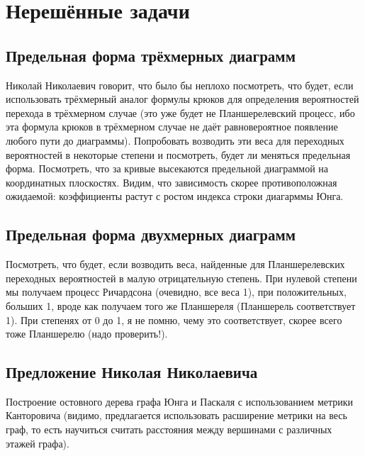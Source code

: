 \documentclass[12pt]{report}
\begin{document}
\section* {Нерешённые задачи}

\subsection*{Предельная форма трёхмерных диаграмм}
\hspace{\parindent} Николай Николаевич говорит, что было бы неплохо посмотреть, что будет, если использовать трёхмерный аналог формулы крюков для определения вероятностей перехода в трёхмерном случае (это уже будет не Планшерелевский процесс, ибо эта формула крюков в трёхмерном случае не даёт равновероятное появление любого пути до диаграммы). Попробовать возводить эти веса для переходных вероятностей в некоторые степени и посмотреть, будет ли меняться предельная форма. Посмотреть, что за кривые высекаются предельной диаграммой на координатных плоскостях. Видим, что зависимость скорее противоположная ожидаемой: коэффициенты растут с ростом индекса строки диагарммы Юнга.

\subsection*{Предельная форма двухмерных диаграмм}

\hspace{\parindent} Посмотреть, что будет, если возводить веса, найденные для Планшерелевских переходных вероятностей в малую отрицательную степень. При нулевой степени мы получаем процесс Ричардсона (очевидно, все веса 1), при положительных, больших 1, вроде как получаем того же Планшереля (Планшерель соответствует 1). При степенях от 0 до 1, я не помню, чему это соответствует, скорее всего тоже Планшерелю (надо проверить!).

\subsection*{Предложение Николая Николаевича}

Построение остовного дерева графа Юнга и Паскаля с использованием метрики Канторовича (видимо, предлагается использовать расширение метрики на весь граф, то есть научиться считать расстояния между вершинами с различных этажей графа).
\end{document}
